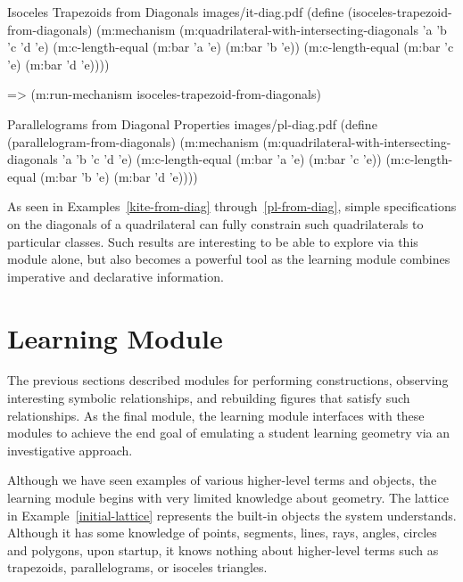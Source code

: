 \begin{pdf-example}
[label=it-from-diag,
comment style={frame hidden,
opacityback=0,
height=5.6cm,
raster columns=2,graphics pages={1,2}}]
{Isoceles Trapezoids from Diagonals}
{images/it-diag.pdf}
(define (isoceles-trapezoid-from-diagonals)
  (m:mechanism
   (m:quadrilateral-with-intersecting-diagonals 'a 'b 'c 'd 'e)
   (m:c-length-equal (m:bar 'a 'e) (m:bar 'b 'e))
   (m:c-length-equal (m:bar 'c 'e) (m:bar 'd 'e))))

=> (m:run-mechanism isoceles-trapezoid-from-diagonals)
\end{pdf-example}

\begin{pdf-example}
[label=pl-from-diag,
comment style={frame hidden,
opacityback=0,
height=5.6cm,
raster columns=2,graphics pages={1,2}}]
{Parallelograms from Diagonal Properties}
{images/pl-diag.pdf}
(define (parallelogram-from-diagonals)
  (m:mechanism
   (m:quadrilateral-with-intersecting-diagonals 'a 'b 'c 'd 'e)
   (m:c-length-equal (m:bar 'a 'e) (m:bar 'c 'e))
   (m:c-length-equal (m:bar 'b 'e) (m:bar 'd 'e))))
\end{pdf-example}

As seen in Examples~\ref{kite-from-diag} through~\ref{pl-from-diag},
simple specifications on the diagonals of a quadrilateral can fully
constrain such quadrilaterals to particular classes.  Such results
are interesting to be able to explore via this module alone, but also
becomes a powerful tool as the learning module combines imperative and
declarative information.

\enlargethispage*{\baselineskip}

\section{Learning Module}
\label{sec:end-goal}

The previous sections described modules for performing constructions,
observing interesting symbolic relationships, and rebuilding figures
that satisfy such relationships. As the final module, the learning
module interfaces with these modules to achieve the end goal of
emulating a student learning geometry via an investigative approach.

Although we have seen examples of various higher-level terms and
objects, the learning module begins with very limited knowledge about
geometry. The lattice in Example~\ref{initial-lattice} represents the
built-in objects the system understands. Although it has some
knowledge of points, segments, lines, rays, angles, circles and
polygons, upon startup, it knows nothing about higher-level terms such
as trapezoids, parallelograms, or isoceles triangles.

